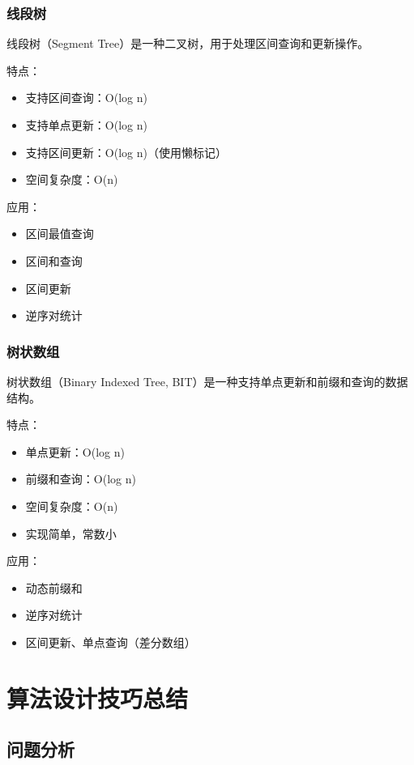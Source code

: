 \subsubsection{线段树}

线段树（Segment Tree）是一种二叉树，用于处理区间查询和更新操作。

特点：
\begin{itemize}
  \item 支持区间查询：O(log n)
  \item 支持单点更新：O(log n)
  \item 支持区间更新：O(log n)（使用懒标记）
  \item 空间复杂度：O(n)
\end{itemize}

应用：
\begin{itemize}
  \item 区间最值查询
  \item 区间和查询
  \item 区间更新
  \item 逆序对统计
\end{itemize}

\subsubsection{树状数组}

树状数组（Binary Indexed Tree, BIT）是一种支持单点更新和前缀和查询的数据结构。

特点：
\begin{itemize}
  \item 单点更新：O(log n)
  \item 前缀和查询：O(log n)
  \item 空间复杂度：O(n)
  \item 实现简单，常数小
\end{itemize}

应用：
\begin{itemize}
  \item 动态前缀和
  \item 逆序对统计
  \item 区间更新、单点查询（差分数组）
\end{itemize}

\section{算法设计技巧总结}

\subsection{问题分析}

